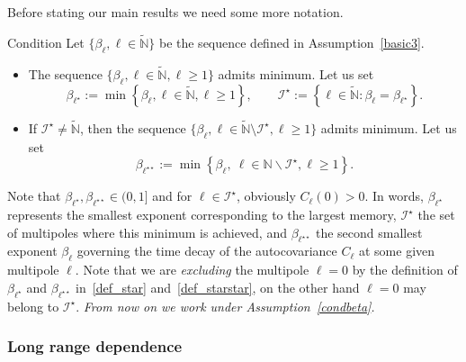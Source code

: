 \documentclass[AHL,Unicode,longabstracts,published]{cedram}
\newcommand{\clI}{\mathcal{I}}
\newcommand{\bbN}{\mathbb{N}}
\begin{document}
Before stating our main results we need some more notation.

\begin{enonce}{Condition}\label{condbeta}
Let $\{ \beta_\ell, \ell \in \widetilde{\bbN}
\}$ be the sequence defined in Assumption~\ref{basic3}.
\begin{itemize}
\item The sequence $\{ \beta_\ell, \ell \in \widetilde{\bbN},
\ell\ge 1\}$ admits minimum. Let us set
\begin{equation}\label{def_star}
\beta_{\ell ^{\star }}:=\min\left\{ \beta _{\ell }, \ell \in \widetilde{
\bbN},\ell\ge 1\right\},\qquad \clI^{\star }:=\left\{\ell\in
\widetilde{\bbN} :\beta _{\ell }=\beta _{\ell ^{\star }}\right\}.
\end{equation}

\item If $\clI^\star\ne \widetilde{\bbN}$, then the sequence $
\{ \beta_\ell, \ell\in \widetilde{\bbN} \setminus \clI ^\star,\ell\ge 1\}$ admits minimum. Let us set
\begin{equation}\label{def_starstar}
\beta_{\ell ^{\star \star }}:=\min \left\{ \beta _{\ell },\ \ell \in \bbN\backslash \clI^{\star },\ell\ge 1\right\}.
\end{equation}
\end{itemize}
\end{enonce}

Note that $\beta_{\ell^\star}, \beta_{\ell^{\star\star}}\in (0,1]$ and for $
\ell\in \clI^\star$, obviously $C_{\ell}(0)> 0$. In words, $\beta _{\ell ^{\star }}$ represents the smallest exponent corresponding to the largest memory, $\clI^{\star }$ the set of multipoles where this minimum is achieved, and $\beta _{\ell ^{\star \star }}$ the second smallest exponent $\beta _{\ell }$ governing the time decay of the autocovariance $ C_\ell$ at some given multipole $\ell$. Note that we are \emph{excluding} the multipole $\ell =0$ by the definition of $\beta_{\ell^\star}$ and $
\beta_{\ell^{\star\star}}$ in~\eqref{def_star} and~\eqref{def_starstar}, on the other hand $\ell=0$ may belong to $\clI^\star$. \emph{From now on we work under Assumption~\ref{condbeta}.}



\subsubsection{Long range dependence}
\end{document}

